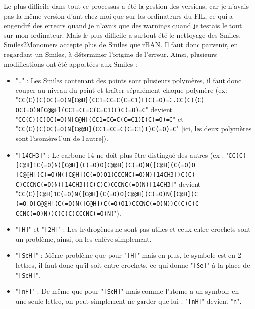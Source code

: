 \documentclass[11pt, a4paper]{report}
\begin{document}
	Le plus difficile dans tout ce processus a été la gestion des versions, car je n'avais pas la même version d'ant chez moi que sur les ordinateurs du FIL, ce qui a engendré des erreurs quand je n'avais que des warnings quand je testais le tout sur mon ordinateur. Mais le plus difficile a surtout été le nettoyage des Smiles. Smiles2Monomers accepte plus de Smiles que rBAN. Il faut donc parvenir, en regardant un Smiles, à déterminer l'origine de l'erreur. Ainsi, plusieurs modifications ont été apportées aux Smiles :
	\begin{itemize}
		\item "\verb|.|" : Les Smiles contenant des points sont plusieurs polymères, il faut donc couper au niveau du point et traîter séparément chaque polymère (ex:
		\\"\verb|CC(C)(C)OC(=O)N[C@H](CC1=CC=C(C=C1)I)C(=O)=C.CC(C)(C)|\\\verb|OC(=O)N[C@@H](CC1=CC=C(C=C1)I)C(=O)=C|" devient \\"\verb|CC(C)(C)OC(=O)N[C@H](CC1=CC=C(C=C1)I)C(=O)=C|" et\\  "\verb|CC(C)(C)OC(=O)N[C@@H](CC1=CC=C(C=C1)I)C(=O)=C|" [ici, les deux polymères sont l'isomère l'un de l'autre]).
		
		\item "\verb|[14CH3]|" : Le carbone 14 ne doit plus être distingué des autres (ex : "\verb|CC(C)|\\\verb|[C@H]1C(=O)N([C@H](C(=O)O[C@@H](C(=O)N([C@H](C(=O)O|\\\verb|[C@@H](C(=O)N([C@H](C(=O)O1)CCCNC(=O)N)[14CH3])C(C)|\\\verb|C)CCCNC(=O)N)[14CH3])C(C)C)CCCNC(=O)N)[14CH3]|" devient \\"\verb|CC(C)[C@H]1C(=O)N([C@H](C(=O)O[C@@H](C(=O)N([C@H](C|\\\verb|(=O)O[C@@H](C(=O)N([C@H](C(=O)O1)CCCNC(=O)N))C(C)C)C|\\\verb|CCNC(=O)N))C(C)C)CCCNC(=O)N)|").
		
		\item "\verb|[H]|" et "\verb|[2H]|" : Les hydrogènes ne sont pas utiles et ceux entre crochets sont un problème, ainsi, on les enlève simplement.
		
		\item "\verb|[SeH]|" : Même problème que pour "\verb|[H]|" mais en plus, le symbole est en 2 lettres, il faut donc qu'il soit entre crochets, ce qui donne "\verb|[Se]|" à la place de "\verb|[SeH]|".
		
		\item "\verb|[nH]|" : De même que pour "\verb|[SeH]|" mais comme l'atome a un symbole en une seule lettre, on peut simplement ne garder que lui : "\verb|[nH]|" devient "\verb|n|".
		

\end{itemize}
\end{document}

